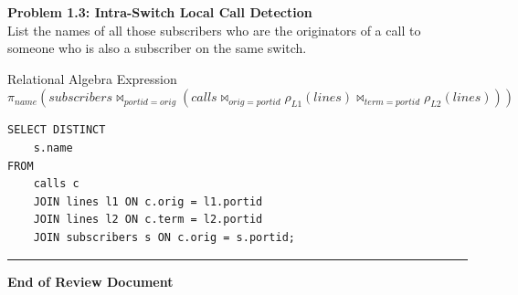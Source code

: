 \documentclass[12pt, addpoints, answers]{exam}
\begin{document}
\begin{questions}
\vspace{1em}

\question \textbf{Problem 1.3: Intra-Switch Local Call Detection} \\
List the names of all those subscribers who are the originators of a call to someone who is also a subscriber on the same switch.

\begin{raguery}{Relational Algebra Expression}
    $\pi_{name}(subscribers \bowtie_{portid=orig} (calls \bowtie_{orig=portid} \rho_{L1}(lines) \bowtie_{term=portid} \rho_{L2}(lines)))$
\end{raguery}

\begin{solution}
\begin{lstlisting}
SELECT DISTINCT
    s.name
FROM
    calls c
    JOIN lines l1 ON c.orig = l1.portid
    JOIN lines l2 ON c.term = l2.portid
    JOIN subscribers s ON c.orig = s.portid;
\end{lstlisting}
\end{solution}

\end{questions}

\begin{center}
    \vfill
    \hrule
    \vspace{0.5em}
    \textbf{End of Review Document}
\end{center}
\end{document}
